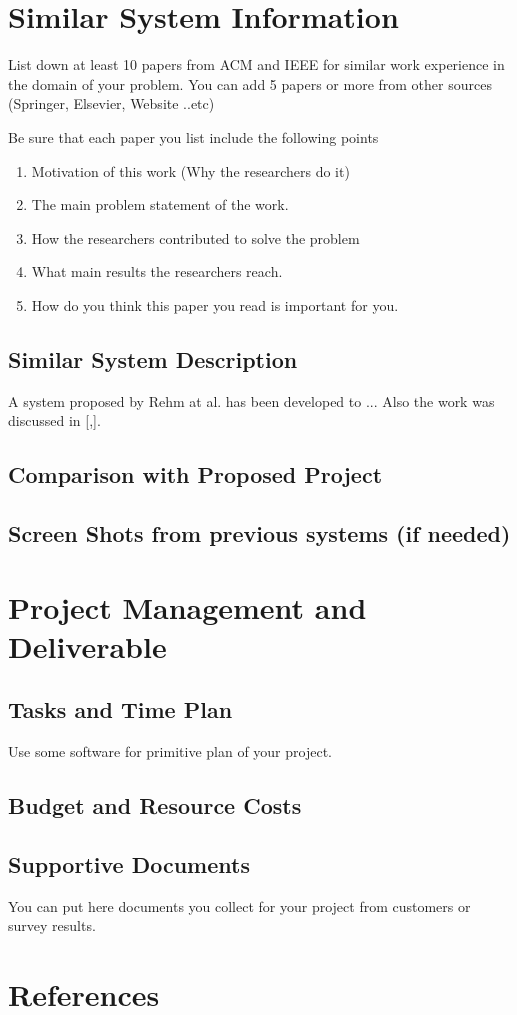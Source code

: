 \documentclass[12pt]{article}
\begin{document}
\section{Similar System Information}
List down at least 10 papers from ACM and IEEE for similar work experience in the domain of your problem. You can add 5 papers or more from other sources (Springer, Elsevier, Website ..etc)

Be sure that each paper you list include the following points

\begin{enumerate}
    \item Motivation of this work (Why the researchers do it)
    \item The main problem statement of the work.
    \item How the researchers contributed to solve the problem
    \item What main results the researchers reach.
    \item How do you think this paper you read is important for you.
\end{enumerate}

\subsection{Similar System Description}
A system proposed by Rehm at al. \cite{Rehm} has been developed to ... Also the work was discussed in [\cite{Weiser},\cite{abc123}].
\subsection{Comparison with Proposed Project}
\subsection{Screen Shots from previous systems (if needed)}

\section{Project Management and Deliverable}
\subsection{Tasks and Time Plan}
Use some software for primitive plan of your project.
\subsection{Budget and Resource Costs}

\subsection{Supportive Documents}
You can put here documents you collect for your project from customers or survey results.
\section {References}



\end{document}
